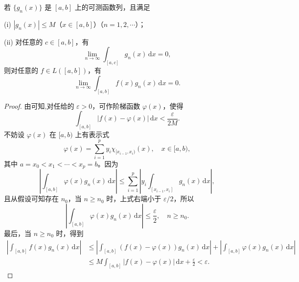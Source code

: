 \documentclass[../../main.tex]{subfiles}
\begin{document}
\begin{theorem}\label{theorem:Riemann-Lebesgue引理的推广}
若 \( \{g_n(x)\} \) 是 \([a,b]\) 上的可测函数列，且满足

(i) \( |g_n(x)| \leqslant M \)（\( x \in [a,b] \)）（\( n = 1,2,\cdots \)）；

(ii) 对任意的 \( c \in [a,b] \)，有
\[
\lim_{n \to \infty} \int_{[a,c]} g_n(x) \, \mathrm{d}x = 0,
\]
则对任意的 \( f \in L([a,b]) \)，有
\[
\lim_{n \to \infty} \int_{[a,b]} f(x) g_n(x) \, \mathrm{d}x = 0.
\]
\end{theorem}
\begin{proof}
由可知,对任给的 \( \varepsilon > 0 \)，可作阶梯函数 \( \varphi(x) \)，使得
\[
\int_{[a,b]} |f(x) - \varphi(x)| \, \mathrm{d}x < \frac{\varepsilon}{2M}.
\]
不妨设 \( \varphi(x) \) 在 \([a,b)\) 上有表示式
\[
\varphi(x) = \sum_{i=1}^p y_i \chi_{[x_{i-1},x_i)}(x), \quad x \in [a,b),
\]
其中 \( a = x_0 < x_1 < \cdots < x_p = b \)。因为
\[
\left| \int_{[a,b]} \varphi(x) g_n(x) \, \mathrm{d}x \right| \leqslant \sum_{i=1}^p \left| y_i \int_{[x_{i-1},x_i]} g_n(x) \, \mathrm{d}x \right|,
\]
且从假设可知存在 \( n_0 \)，当 \( n \geqslant n_0 \) 时，上式右端小于 \( \varepsilon/2 \)，所以
\[
\left| \int_{[a,b]} \varphi(x) g_n(x) \, \mathrm{d}x \right| \leqslant \frac{\varepsilon}{2}, \quad n \geqslant n_0.
\]
最后，当 \( n \geqslant n_0 \) 时，得到
\begin{align*}
\left| \int_{[a,b]} f(x) g_n(x) \, \mathrm{d}x \right| &\leqslant \left| \int_{[a,b]} (f(x) - \varphi(x)) g_n(x) \, \mathrm{d}x \right| + \left| \int_{[a,b]} \varphi(x) g_n(x) \, \mathrm{d}x \right| \\
&\leqslant M \int_{[a,b]} |f(x) - \varphi(x)| \, \mathrm{d}x + \frac{\varepsilon}{2} < \varepsilon.
\end{align*}

\end{proof}
\end{document}
